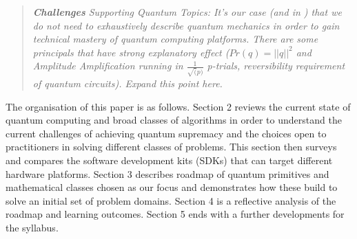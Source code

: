 \begin{quote}\itshape
	\textbf{\emph{Challenges}}
	\emph{Supporting Quantum Topics}: It's our case (and in \cite{Abhijith:2018}) that we do not need to exhaustively describe quantum
	mechanics in order to gain technical mastery of quantum computing platforms.  There are some principals that have strong explanatory
	effect ($Pr(q) = ||q||^{2}$ and Amplitude Amplification running in $\frac{1}{\sqrt(p)}$ p-trials, reversibility requirement of 
	quantum circuits). Expand this point here.
\end{quote}\ignorespacesafterend

The organisation of this paper is as follows.  Section 2 reviews the current state of quantum computing and broad classes of algorithms
in order to understand the current challenges of achieving quantum supremacy and the choices open to practitioners in solving different 
classes of problems.  
This section then surveys and compares the software development kits (SDKs) that can target different hardware platforms.  
Section 3 describes roadmap of quantum primitives and mathematical classes chosen as our focus and demonstrates how these build to
solve an initial set of problem domains.  Section 4 is a reflective analysis of the roadmap and learning outcomes.  
Section 5 ends with a further developments for the syllabus.

